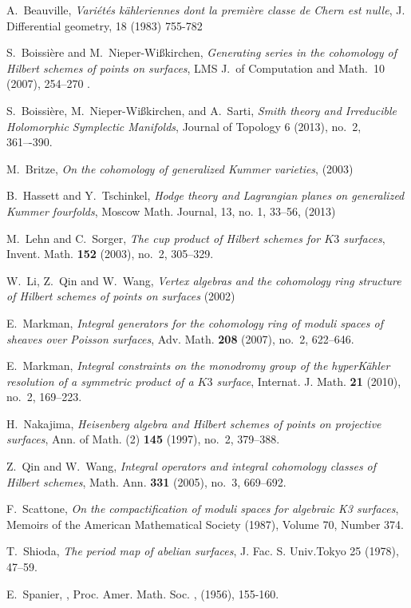 
\begin{thebibliography}{10}

A.~Beauville, \emph{Vari\'et\'es k\"ahleriennes dont la premi\`ere classe de Chern est nulle}, 
  J. Differential geometry, 18 (1983) 755-782

S.~Boissi\`ere and M.~Nieper-Wi{\ss}kirchen, \emph{Generating series in the cohomology 
  of Hilbert schemes of points on surfaces}, LMS J.~of Computation and Math.~10 (2007), 254--270 .

S.~Boissi\`ere, M.~Nieper-Wi{\ss}kirchen, and A.~Sarti, \emph{Smith theory and 
  Irreducible Holomorphic Symplectic Manifolds}, Journal of Topology 6 (2013), no.~2, 361–-390.

M.~Britze, \emph{On the cohomology of generalized Kummer varieties}, (2003) 

B.~Hassett and Y.~Tschinkel, \emph{ Hodge theory and Lagrangian planes on 
  generalized Kummer fourfolds}, Moscow Math. Journal, 13, no. 1, 33--56, (2013) 
  
M.~Lehn and C.~Sorger, \emph{The cup product of {H}ilbert schemes for {$K3$}
  surfaces}, Invent. Math. \textbf{152} (2003), no.~2, 305--329.

W.~Li, Z.~Qin and W.~Wang, \emph{Vertex algebras and the cohomology ring structure of 
  Hilbert schemes of points on surfaces} (2002)

E.~Markman, \emph{Integral generators for the cohomology ring of moduli spaces of
  sheaves over {P}oisson surfaces}, Adv. Math. \textbf{208} (2007), no.~2,
  622--646.

E.~Markman, \emph{Integral constraints on the monodromy group of the
  hyper{K}\"ahler resolution of a symmetric product of a {$K3$} surface},
  Internat. J. Math. \textbf{21} (2010), no.~2, 169--223.

H.~Nakajima, \emph{Heisenberg algebra and {H}ilbert schemes of points on
  projective surfaces}, Ann. of Math. (2) \textbf{145} (1997), no.~2, 379--388.

Z.~Qin and W.~Wang, \emph{Integral operators and integral cohomology classes of
  {H}ilbert schemes}, Math. Ann. \textbf{331} (2005), no.~3, 669--692.

F.~Scattone, \emph{On the compactification of moduli spaces for algebraic K3 surfaces},
  Memoirs of the American Mathematical Society (1987), Volume 70, Number 374.

T.~Shioda, \emph{The period map of abelian surfaces}, J. Fac. S. Univ.Tokyo 25 (1978), 47--59.

E.~Spanier, 
,
\newblock Proc. Amer. Math. Soc.
, (1956), 155-160.

\end{thebibliography}